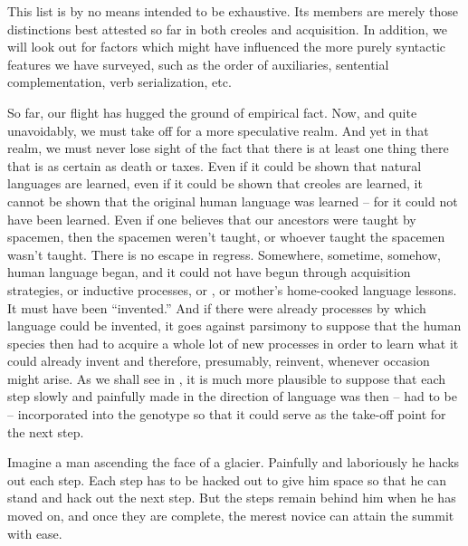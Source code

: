 This list is by no means intended to be exhaustive. Its members are merely those distinctions best attested so far in both creoles and acquisition. In addition, we will look out for factors which might have influenced the more purely syntactic features we have surveyed, such as the order of auxiliaries, sentential complementation, verb serialization, etc.

So far, our flight has hugged the ground of empirical fact. Now,
and quite unavoidably, we must take off for a more speculative realm. And yet in that realm, we must never lose sight of the fact that there is at least one thing there that is as certain as death or taxes. Even if it could be shown that natural languages are learned, even if it could be shown that creoles are learned, it cannot be shown that the original human language was learned -- for it could not have been learned. Even if one believes that our ancestors were taught by spacemen, then the spacemen weren't taught, or whoever taught the spacemen wasn't taught. There is no escape in regress. Somewhere, sometime, somehow, human language began, and it could not have begun through acquisition strategies, or inductive processes, or , or mother's home-cooked language lessons. It must have been ``invented.'' And if there were already processes by which language could be invented, it goes against parsimony to suppose that the human species then had to acquire a whole lot of new processes in order to learn what it could already invent and therefore, presumably, reinvent, whenever occasion might arise. As we shall see in , it is much more plausible to suppose that each step slowly and painfully made in the direction of language was then -- had to be -- incorporated into the genotype so that it could serve as the take-off point for the next step.

Imagine a man ascending the face of a glacier. Painfully and laboriously he hacks out each step. Each step has to be hacked out to give him space so that he can stand and hack out the next step. But the steps remain behind him when he has moved on, and once they are complete, the merest novice can attain the summit with ease.